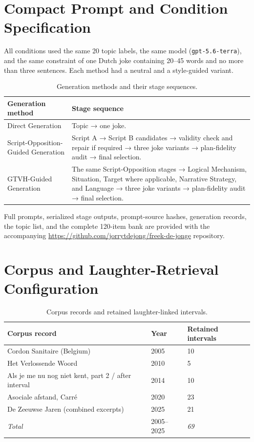 \documentclass[11pt]{article}
\begin{document}
\section{Compact Prompt and Condition Specification}\label{appendix-b-compact-prompt-and-condition-specification}

All conditions used the same 20 topic labels, the same model (\texttt{gpt-5.6-terra}), and the same constraint of one Dutch joke containing 20--45 words and no more than three sentences. Each method had a neutral and a style-guided variant.

\begin{table}[t]
\centering
\caption{Generation methods and their stage sequences.}\label{tab:condition-specification}
\scriptsize\begin{tabularx}{\textwidth}{YY}
\toprule\noalign{}
Generation method & Stage sequence \\
\midrule\noalign{}

Direct Generation & Topic → one joke. \\
Script-Opposition-Guided Generation & Script A → Script B candidates → validity check and repair if required → three joke variants → plan-fidelity audit → final selection. \\
GTVH-Guided Generation & The same Script-Opposition stages → Logical Mechanism, Situation, Target where applicable, Narrative Strategy, and Language → three joke variants → plan-fidelity audit → final selection. \\
\bottomrule
\end{tabularx}\end{table}

Full prompts, serialized stage outputs, prompt-source hashes, generation records, the topic list, and the complete 120-item bank are provided with the accompanying \url{https://github.com/jorrytdejong/freek-de-jonge} repository.

\section{Corpus and Laughter-Retrieval Configuration}\label{appendix-c-corpus-and-laughter-retrieval-configuration}

\begin{table}[t]
\centering
\caption{Corpus records and retained laughter-linked intervals.}\label{tab:corpus-records}
\scriptsize\begin{tabularx}{\textwidth}{YYY}
\toprule\noalign{}
Corpus record & Year & Retained intervals \\
\midrule\noalign{}

Cordon Sanitaire (Belgium) & 2005 & 10 \\
Het Verlossende Woord & 2010 & 5 \\
Als je me nu nog niet kent, part 2 / after interval & 2014 & 10 \\
Asociale afstand, Carré & 2020 & 23 \\
De Zeeuwse Jaren (combined excerpts) & 2025 & 21 \\
\emph{Total} & 2005--2025 & \emph{69} \\
\bottomrule
\end{tabularx}\end{table}
\end{document}

